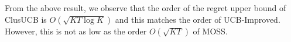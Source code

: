 From the above result, we observe that the order of the regret upper bound of ClusUCB is $O(\sqrt{KT\log K})$ and this matches the order of UCB-Improved. However, this is not as low as the order $O(\sqrt{KT})$ of MOSS. 




% 
%
%
%
%
%

